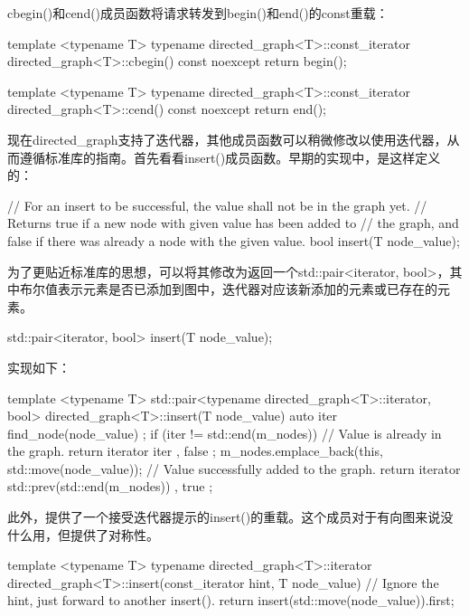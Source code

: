 cbegin()和cend()成员函数将请求转发到begin()和end()的const重载：

\begin{cpp}
template <typename T>
typename directed_graph<T>::const_iterator
    directed_graph<T>::cbegin() const noexcept { return begin(); }

template <typename T>
typename directed_graph<T>::const_iterator
    directed_graph<T>::cend() const noexcept { return end(); }
\end{cpp}


现在directed\_graph支持了迭代器，其他成员函数可以稍微修改以使用迭代器，从而遵循标准库的指南。首先看看insert()成员函数。早期的实现中，是这样定义的：

\begin{cpp}
// For an insert to be successful, the value shall not be in the graph yet.
// Returns true if a new node with given value has been added to // the graph, and false if there was already a node with the given value.
bool insert(T node_value);
\end{cpp}

为了更贴近标准库的思想，可以将其修改为返回一个std::pair<iterator, bool>，其中布尔值表示元素是否已添加到图中，迭代器对应该新添加的元素或已存在的元素。

\begin{cpp}
std::pair<iterator, bool> insert(T node_value);
\end{cpp}

实现如下：

\begin{cpp}
template <typename T>
std::pair<typename directed_graph<T>::iterator, bool>
    directed_graph<T>::insert(T node_value)
{
    auto iter { find_node(node_value) };
    if (iter != std::end(m_nodes)) {
        // Value is already in the graph.
        return { iterator { iter }, false };
    }
    m_nodes.emplace_back(this, std::move(node_value));
    // Value successfully added to the graph.
    return { iterator { std::prev(std::end(m_nodes)) }, true };
}
\end{cpp}

此外，提供了一个接受迭代器提示的insert()的重载。这个成员对于有向图来说没什么用，但提供了对称性。

\begin{cpp}
template <typename T>
typename directed_graph<T>::iterator
    directed_graph<T>::insert(const_iterator hint, T node_value)
{
    // Ignore the hint, just forward to another insert().
    return insert(std::move(node_value)).first;
}
\end{cpp}

